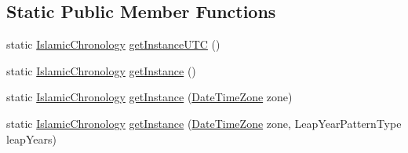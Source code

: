 \subsection*{Static Public Member Functions}
\begin{DoxyCompactItemize}
\item 
static \hyperlink{classorg_1_1joda_1_1time_1_1chrono_1_1_islamic_chronology}{Islamic\-Chronology} \hyperlink{classorg_1_1joda_1_1time_1_1chrono_1_1_islamic_chronology_a95aee97ffaa66d76a23c5246170a9c7c}{get\-Instance\-U\-T\-C} ()
\item 
static \hyperlink{classorg_1_1joda_1_1time_1_1chrono_1_1_islamic_chronology}{Islamic\-Chronology} \hyperlink{classorg_1_1joda_1_1time_1_1chrono_1_1_islamic_chronology_a72a11be865aff233c614d4f78286aac0}{get\-Instance} ()
\item 
static \hyperlink{classorg_1_1joda_1_1time_1_1chrono_1_1_islamic_chronology}{Islamic\-Chronology} \hyperlink{classorg_1_1joda_1_1time_1_1chrono_1_1_islamic_chronology_a39baaaa7baab0dc78d917bdf27138678}{get\-Instance} (\hyperlink{classorg_1_1joda_1_1time_1_1_date_time_zone}{Date\-Time\-Zone} zone)
\item 
static \hyperlink{classorg_1_1joda_1_1time_1_1chrono_1_1_islamic_chronology}{Islamic\-Chronology} \hyperlink{classorg_1_1joda_1_1time_1_1chrono_1_1_islamic_chronology_a52a5492e7d2fcc3d6de13758d011aa24}{get\-Instance} (\hyperlink{classorg_1_1joda_1_1time_1_1_date_time_zone}{Date\-Time\-Zone} zone, Leap\-Year\-Pattern\-Type leap\-Years)
\end{DoxyCompactItemize}
